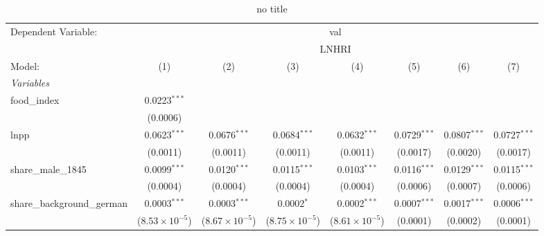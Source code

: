 
\begin{table}[htbp]
   \caption{no title}
   \centering
   \begin{tabular}{lccccccc}
      \tabularnewline \midrule \midrule
      Dependent Variable: & \multicolumn{7}{c}{val}\\
       & \multicolumn{7}{c}{LNHRI} \\ 
      Model:                                     & (1)                     & (2)                     & (3)                     & (4)                     & (5)            & (6)             & (7)\\  
      \midrule
      \emph{Variables}\\
      food\_index                                & 0.0223$^{***}$          &                         &                         &                         &                &                 &   \\   
                                                 & (0.0006)                &                         &                         &                         &                &                 &   \\   
      lnpp                                       & 0.0623$^{***}$          & 0.0676$^{***}$          & 0.0684$^{***}$          & 0.0632$^{***}$          & 0.0729$^{***}$ & 0.0807$^{***}$  & 0.0727$^{***}$\\   
                                                 & (0.0011)                & (0.0011)                & (0.0011)                & (0.0011)                & (0.0017)       & (0.0020)        & (0.0017)\\   
      share\_male\_1845                          & 0.0099$^{***}$          & 0.0120$^{***}$          & 0.0115$^{***}$          & 0.0103$^{***}$          & 0.0116$^{***}$ & 0.0129$^{***}$  & 0.0115$^{***}$\\   
                                                 & (0.0004)                & (0.0004)                & (0.0004)                & (0.0004)                & (0.0006)       & (0.0007)        & (0.0006)\\   
      share\_background\_german                  & 0.0003$^{***}$          & 0.0003$^{***}$          & 0.0002$^{*}$            & 0.0002$^{***}$          & 0.0007$^{***}$ & 0.0017$^{***}$  & 0.0006$^{***}$\\   
                                                 & ($8.53\times 10^{-5}$)  & ($8.67\times 10^{-5}$)  & ($8.75\times 10^{-5}$)  & ($8.61\times 10^{-5}$)  & (0.0001)       & (0.0002)        & (0.0001)\\   

\end{tabular}
\end{table}
